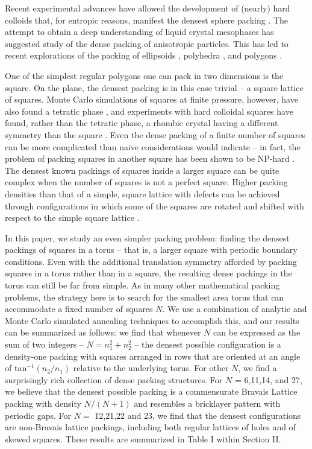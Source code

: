 \documentclass[preprint,aps]{revtex4}
\begin{document}
Recent experimental advances have allowed the development of (nearly) hard colloids that, for entropic reasons, manifest the densest sphere packing \cite{Pusey1986}. The attempt to obtain a deep understanding of liquid crystal mesophases has suggested study of the dense packing of anisotropic particles. This has led to recent explorations of the packing of ellipsoids \cite{Donev2004}, polyhedra \cite{ROAN,BAKER}, and polygons \cite{Jansson2006,STROOBANTS}.

One of the simplest regular polygons one can pack in two dimensions is the square. On the plane, the densest packing is in this case trivial -- a square lattice of squares. Monte Carlo simulations of squares at finite pressure, however, have also found a tetratic phase \cite{Donev2006}, and experiments with hard colloidal squares have found, rather than the tetratic phase, a rhombic crystal having a different symmetry than the square \cite{Zhao2011}. Even the dense packing of a finite number of squares can be more complicated than naive considerations would indicate -- in fact, the problem of packing squares in another square has been shown to be NP-hard \cite{Leung1990}. The densest known packings of squares inside a larger square can be quite complex \cite{ERDOS1975,Friedman2002} when the number of squares is not a perfect square. Higher packing densities than that of a simple, square lattice with defects can be achieved through configurations in which some of the squares are rotated and shifted with respect to the simple square lattice \cite{Friedman2002}.

In this paper, we study an even simpler packing problem: finding the densest packings of squares in a torus -- that is, a larger square with periodic boundary conditions. Even with the additional translation symmetry afforded by packing squares in a torus rather than in a square, the resulting dense packings in the torus can still be far from simple. As in many other mathematical packing problems, the strategy here is to search for the smallest area torus that can accommodate a fixed number of squares $N$.  We use a combination of analytic and Monte Carlo simulated annealing techniques to accomplish this, and our results can be summarized as follows: we find that whenever $N$ can be expressed as the sum of two integers -- $N=n_1^2+n_2^2$ -- the densest possible configuration is a density-one packing with squares arranged in rows that are oriented at an angle of tan$^{-1}(n_2/n_1)$ relative to the underlying torus.  For other $N$, we find a surprisingly rich collection of dense packing structures. For $N$ = 6,11,14, and 27, we believe that the densest possible packing is a commensurate Bravais Lattice packing with density $N/(N+1)$ and resembles a bricklayer pattern with periodic gaps.  For $N=$ 12,21,22 and 23, we find that the densest configurations are non-Bravais lattice packings, including both regular lattices of holes and of skewed squares. These results are summarized in Table I within Section II.
\end{document}
